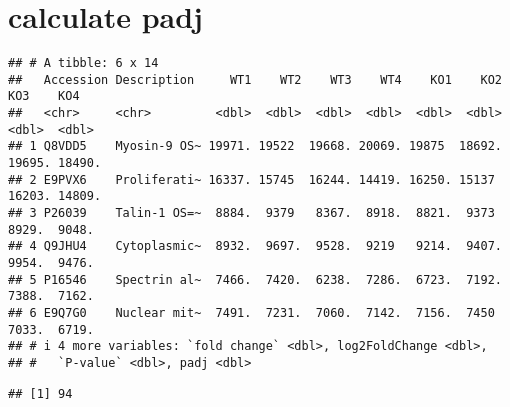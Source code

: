 \documentclass[
]{article}
\newenvironment{Shaded}{\begin{snugshade}}{\end{snugshade}}
\newcommand{\AttributeTok}[1]{\textcolor[rgb]{0.13,0.29,0.53}{#1}}
\newcommand{\FloatTok}[1]{\textcolor[rgb]{0.00,0.00,0.81}{#1}}
\newcommand{\FunctionTok}[1]{\textcolor[rgb]{0.13,0.29,0.53}{\textbf{#1}}}
\newcommand{\NormalTok}[1]{#1}
\newcommand{\OtherTok}[1]{\textcolor[rgb]{0.56,0.35,0.01}{#1}}
\newcommand{\SpecialCharTok}[1]{\textcolor[rgb]{0.81,0.36,0.00}{\textbf{#1}}}
\newcommand{\StringTok}[1]{\textcolor[rgb]{0.31,0.60,0.02}{#1}}
\begin{document}
\hypertarget{calculate-padj}{%
\section{calculate padj}\label{calculate-padj}}

\begin{Shaded}
\end{Shaded}

\begin{verbatim}
## # A tibble: 6 x 14
##   Accession Description     WT1    WT2    WT3    WT4    KO1    KO2    KO3    KO4
##   <chr>     <chr>         <dbl>  <dbl>  <dbl>  <dbl>  <dbl>  <dbl>  <dbl>  <dbl>
## 1 Q8VDD5    Myosin-9 OS~ 19971. 19522  19668. 20069. 19875  18692. 19695. 18490.
## 2 E9PVX6    Proliferati~ 16337. 15745  16244. 14419. 16250. 15137  16203. 14809.
## 3 P26039    Talin-1 OS=~  8884.  9379   8367.  8918.  8821.  9373   8929.  9048.
## 4 Q9JHU4    Cytoplasmic~  8932.  9697.  9528.  9219   9214.  9407.  9954.  9476.
## 5 P16546    Spectrin al~  7466.  7420.  6238.  7286.  6723.  7192.  7388.  7162.
## 6 E9Q7G0    Nuclear mit~  7491.  7231.  7060.  7142.  7156.  7450   7033.  6719.
## # i 4 more variables: `fold change` <dbl>, log2FoldChange <dbl>,
## #   `P-value` <dbl>, padj <dbl>
\end{verbatim}

\begin{Shaded}
\end{Shaded}

\begin{verbatim}
## [1] 94
\end{verbatim}

\begin{Shaded}
\end{Shaded}
\end{document}
